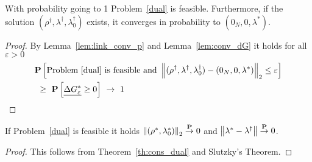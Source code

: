 \begin{theorem}
  \label{th:cons_dual}
  With probability going to 1 Problem~\ref{dual} is feasible.
  Furthermore, if the solution 
$
(\rho^\dagger,\lambda^\dagger,\lambda_0^\dagger)
$
exists,
it
converges in probability to 
$
(0_N,0,\lambda^*)
$.
\end{theorem}
\begin{proof}
  By Lemma~\ref{lem:link_conv_p} and Lemma~\ref{lem:conv_dG}
  it holds for all $\varepsilon>0$
  \begin{align*}
    &
    \P
    \left[ 
      \text{Problem~\ref{dual} is feasible and }
      \norm{
(\rho^\dagger,\lambda^\dagger,\lambda_0^\dagger)
-
(0_N,0,\lambda^*)
      }_2
      \le \varepsilon
    \right]
    \\
    &
    \ 
    \ge
    \ 
    \P
    \left[ \underline{\Delta G^*_\varepsilon}\ge 0 \right]
    \ 
    \to
    \ 
    1
  \end{align*}
\end{proof}
\begin{corollary}
  If Problem~\ref{dual} is feasible it holds
  $\left\lVert(\rho^*,\lambda_0^*)\right\rVert_2\overset{\mathbf{P}}{\to}0$
  and
  $\left\lVert\lambda^*-\lambda^\dagger\right\rVert\overset{\mathbf{P}}{\to}0$.
\end{corollary}
\begin{proof}
  This follows from Theorem~\ref{th:cons_dual}
  and Slutzky's Theorem.
\end{proof}
